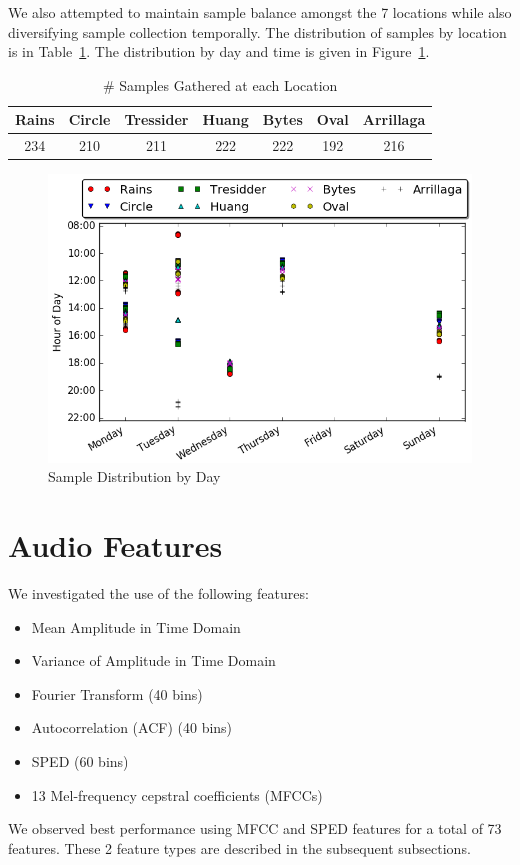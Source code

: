 \documentclass[journal]{IEEEtran}
\begin{document}
We also attempted to maintain sample balance amongst the 7 locations while also diversifying sample collection temporally. The distribution of samples by location is in Table~\ref{tbl:locs}. The distribution by day and time is given in Figure~\ref{fig:days}.
\begin{table}[H]
\centering
\caption{\# Samples Gathered at each Location}
\begin{tabular}{|c|c|c|c|c|c|c|}
\hline
\textbf{Rains} & \textbf{Circle} &\textbf{Tressider}&\textbf{Huang}&\textbf{Bytes}&\textbf{Oval}&\textbf{Arrillaga}\\
\hline
234& 210& 211 & 222 & 222 & 192 & 216\\
\hline
\end{tabular}
\label{tbl:locs}
\end{table}

\begin{figure}[H]
\centering
\includegraphics[width=0.9\linewidth]{data_distribution}
\caption{Sample Distribution by Day}
\label{fig:days}
\end{figure}

\section{Audio Features}
We investigated the use of the following features:
\begin{itemize}
\item Mean Amplitude in Time Domain
\item Variance of Amplitude in Time Domain
\item Fourier Transform (40 bins)
\item Autocorrelation (ACF) (40 bins)
\item SPED (60 bins)
\item 13 Mel-frequency cepstral coefficients (MFCCs)
\end{itemize}
We observed best performance using MFCC and SPED features for a total of 73 features. These 2 feature types are described in the subsequent subsections.
\end{document}
